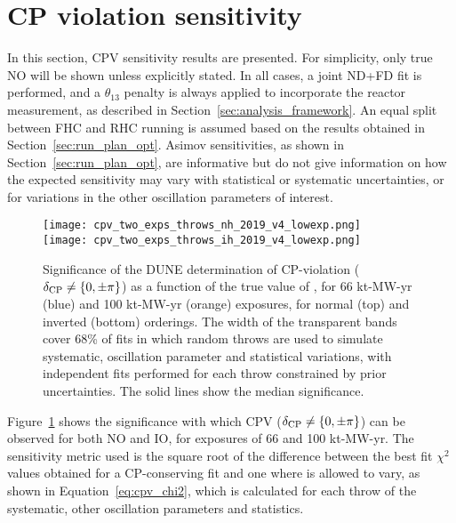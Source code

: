 \FloatBarrier
\section{CP violation sensitivity}
\label{sec:cp_sens}

In this section, CPV sensitivity results are presented. For simplicity, only true NO will be shown unless explicitly stated. In all cases, a joint ND+FD fit is performed, and a $\theta_{13}$ penalty is always applied to incorporate the reactor measurement, as described in Section~\ref{sec:analysis_framework}. An equal split between FHC and RHC running is assumed based on the results obtained in Section~\ref{sec:run_plan_opt}. Asimov sensitivities, as shown in Section~\ref{sec:run_plan_opt}, are informative but do not give information on how the expected sensitivity may vary with statistical or systematic uncertainties, or for variations in the other oscillation parameters of interest.

\begin{figure}[htbp]
  \centering
  \texttt{[image: cpv\_two\_exps\_throws\_nh\_2019\_v4\_lowexp.png]}\\
  \texttt{[image: cpv\_two\_exps\_throws\_ih\_2019\_v4\_lowexp.png]}
  \caption{Significance of the DUNE determination of CP-violation ($\delta_{\rm CP} \neq \{0,\pm\pi\}$) as a function of the true value of \deltacp, for 66 kt-MW-yr (blue) and 100 kt-MW-yr (orange) exposures, for normal (top) and inverted (bottom) orderings. The width of the transparent bands cover 68\% of fits in which random throws are used to simulate systematic, oscillation parameter and statistical variations, with independent fits performed for each throw constrained by prior uncertainties. The solid lines show the median significance.}
  \label{fig:cpv_bands}
\end{figure}
Figure~\ref{fig:cpv_bands} shows the significance with which CPV ($\delta_{\rm CP} \neq \{0,\pm\pi\}$) can be observed for both NO and IO, for exposures of 66 and 100 kt-MW-yr.  The sensitivity metric used is the square root of the difference between the best fit $\chi^{2}$ values obtained for a CP-conserving fit and one where \deltacp is allowed to vary, as shown in Equation~\ref{eq:cpv_chi2}, which is calculated for each throw of the systematic, other oscillation parameters and statistics. %


